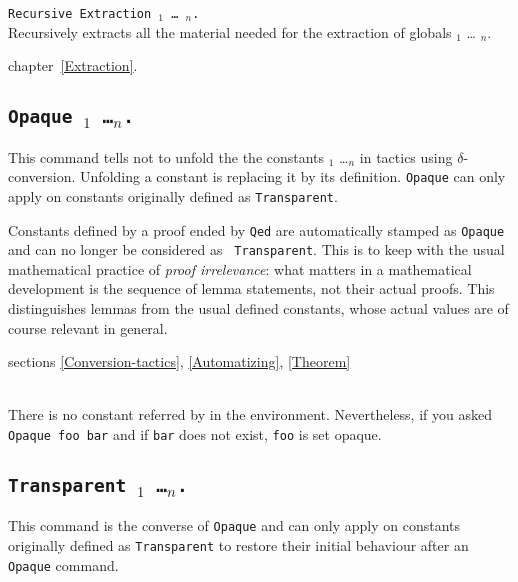 \begin{Variants}
\item \texttt{Recursive Extraction {\qualid$_1$} \ldots{} {\qualid$_n$}.}\\
  Recursively extracts all the material needed for the extraction of 
  globals {\qualid$_1$} \ldots{} {\qualid$_n$}.
\end{Variants}

\SeeAlso chapter~\ref{Extraction}.

\subsection{\tt Opaque \qualid$_1$ \dots \qualid$_n$.}
\label{Opaque} This command tells not to unfold the
the constants {\qualid$_1$} \dots {\qualid$_n$} in tactics using
$\delta$-conversion. Unfolding a constant is replacing it by its
definition. {\tt Opaque} can only apply on constants originally
defined as {\tt Transparent}.

Constants defined by a proof ended by {\tt Qed} are automatically
stamped as {\tt Opaque} and can no longer be considered as {\tt
Transparent}. This is to keep with the usual mathematical practice of
{\em proof irrelevance}: what matters in a mathematical development is
the sequence of lemma statements, not their actual proofs. This
distinguishes lemmas from the usual defined constants, whose actual
values are of course relevant in general.

\SeeAlso sections \ref{Conversion-tactics}, \ref{Automatizing},
\ref{Theorem}

\begin{ErrMsgs}
\item {}\\
    There is no constant referred by {\qualid} in the environment.
    Nevertheless, if you asked \texttt{Opaque foo bar}
    and if \texttt{bar} does not exist, \texttt{foo} is set opaque.
\end{ErrMsgs}

\subsection{\tt Transparent \qualid$_1$ \dots \qualid$_n$.}
\label{Transparent}
This command is the converse of {\tt Opaque} and can only apply on constants originally defined as {\tt Transparent} to restore their initial behaviour after an {\tt Opaque} command.

